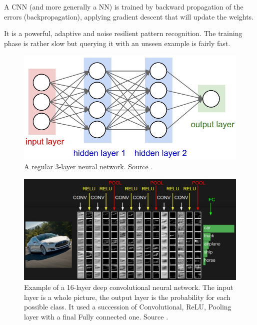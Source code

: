 A CNN (and more generally a NN) is trained by backward propagation of the errors (backpropagation), applying gradient descent that will update the weights.

It is a powerful, adaptive and noise resilient pattern recognition. The training phase is rather slow but querying it with an unseen example is fairly fast.

\begin{figure}[h]
    \centering
    \includegraphics[scale=0.4]{img/nn_3_layers.jpeg}
    \caption[A regular 3-layer neural network]{A regular 3-layer neural network. Source \cite{StandfordCourse}.}
    \label{fig:nn_3_layer}
\end{figure}

\begin{figure}[h]
    \includegraphics[scale=0.35]{img/cnn_simple_example.jpeg}
    \caption[Example of a 16-layer deep convolutional neural network]{Example of a 16-layer deep convolutional neural network. The input layer is a whole picture, the output layer is the probability for each possible class. It used a succession of Convolutional, ReLU, Pooling layer with a final Fully connected one. Source \cite{StandfordCourse}.}
    \label{fig:cnn_simple_example}
\end{figure}

